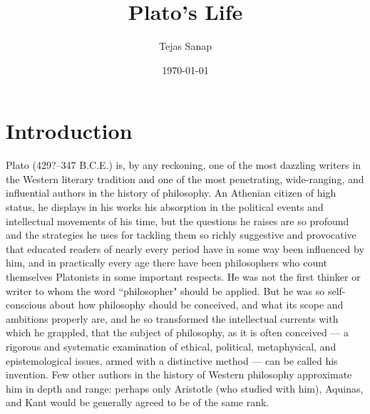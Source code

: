 \documentclass[11pt]{article}
\title{Plato's Life}
\author{Tejas Sanap}
\date{\today}
\begin{document}
	\maketitle
	\tableofcontents

	\section{Introduction}

		Plato (429?–347 B.C.E.) is, by any reckoning, one of the most dazzling writers in the Western literary tradition and one of the most penetrating, wide-ranging, and influential authors in the history of philosophy. An Athenian citizen of high status, he displays in his works his absorption in the political events and intellectual movements of his time, but the questions he raises are so profound and the strategies he uses for tackling them so richly suggestive and provocative that educated readers of nearly every period have in some way been influenced by him, and in practically every age there have been philosophers who count themselves Platonists in some important respects. He was not the first thinker or writer to whom the word ``philosopher" should be applied. But he was so self-conscious about how philosophy should be conceived, and what its scope and ambitions properly are, and he so transformed the intellectual currents with which he grappled, that the subject of philosophy, as it is often conceived --- a rigorous and systematic examination of ethical, political, metaphysical, and epistemological issues, armed with a distinctive method --- can be called his invention. Few other authors in the history of Western philosophy approximate him in depth and range: perhaps only Aristotle (who studied with him), Aquinas, and Kant would be generally agreed to be of the same rank.
\end{document}
